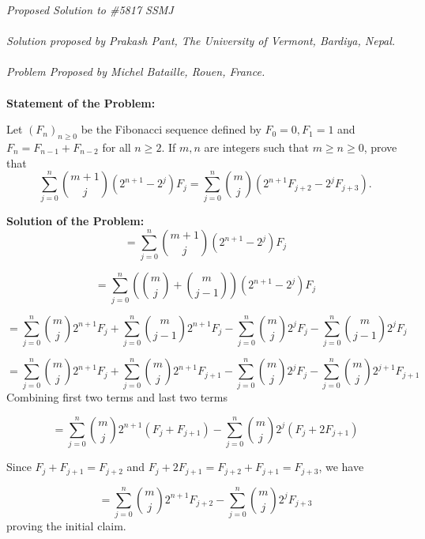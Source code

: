 \documentclass[12pt]{article}
\begin{document}
\textit{Proposed Solution to \#5817 SSMJ }\\ \\
\textit{Solution proposed by Prakash Pant, The University of Vermont, Bardiya, Nepal.}\\ \\
\textit{Problem Proposed by Michel Bataille, Rouen, France.
} \\ \\
\textbf{Statement of the Problem:}

Let \((F_n)_{n \ge 0}\) be the Fibonacci sequence defined by 
\(F_0 = 0, F_1 = 1 \) and \(F_n = F_{n-1} + F_{n-2}\) for all \(n \ge 2\). 
If \(m, n\) are integers such that \(m \ge n \ge 0\), prove that
\[
\sum_{j=0}^{n} 
\binom{m+1}{j} 
(2^{n+1} - 2^{j}) F_j
=
\sum_{j=0}^{n} 
\binom{m}{j} 
(2^{n+1} F_{j+2} - 2^{j} F_{j+3}).
\]

\textbf{Solution of the Problem:}
\[
= \sum_{j=0}^{n} 
\binom{m+1}{j} 
(2^{n+1} - 2^{j}) F_j\]

\[= \sum_{j=0}^{n} 
\left( \binom{m}{j} + \binom{m}{j-1} \right) 
(2^{n+1} - 2^{j}) F_j \]

\[= \sum_{j=0}^{n} 
\binom{m}{j} 
2^{n+1} F_j +\sum_{j=0}^{n} 
\binom{m}{j-1} 
2^{n+1} F_j -\sum_{j=0}^{n} 
\binom{m}{j} 
2^{j} F_j  -\sum_{j=0}^{n} 
\binom{m}{j-1} 
2^{j} F_j \]

\[= \sum_{j=0}^{n} 
\binom{m}{j} 
2^{n+1} F_j +\sum_{j=0}^{n} 
\binom{m}{j} 
2^{n+1} F_{j+1} -\sum_{j=0}^{n} 
\binom{m}{j} 
2^{j} F_j  -\sum_{j=0}^{n} 
\binom{m}{j} 
2^{j+1} F_{j+1} \]
Combining first two terms and last two terms

\[= \sum_{j=0}^{n} 
\binom{m}{j} 
2^{n+1}( F_j +F_{j+1})  -\sum_{j=0}^{n} 
\binom{m}{j} 
2^{j} (F_j + 2 F_{j+1})   \]

Since \( F_j + F_{j+1} = F_{j+2} \) and \( F_{j} + 2F_{j+1} = F_{j+2} + F_{j+1} = F_{j+3}\), we have 

\[= \sum_{j=0}^{n} 
\binom{m}{j} 
2^{n+1}F_{j+2}  -\sum_{j=0}^{n} 
\binom{m}{j} 
2^{j} F_{j+3}\]
proving the initial claim.
\end{document}
